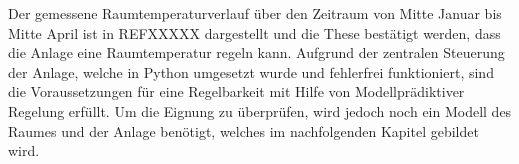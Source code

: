 Der gemessene Raumtemperaturverlauf über den Zeitraum von Mitte Januar bis Mitte April ist in REFXXXXX dargestellt und die These bestätigt werden, dass die Anlage eine Raumtemperatur regeln kann.
Aufgrund der zentralen Steuerung der Anlage, welche in Python umgesetzt wurde und fehlerfrei funktioniert, sind die Voraussetzungen für eine Regelbarkeit mit Hilfe von Modellprädiktiver Regelung erfüllt. Um die Eignung zu überprüfen, wird jedoch noch ein Modell des Raumes und der Anlage benötigt, welches im nachfolgenden Kapitel gebildet wird.